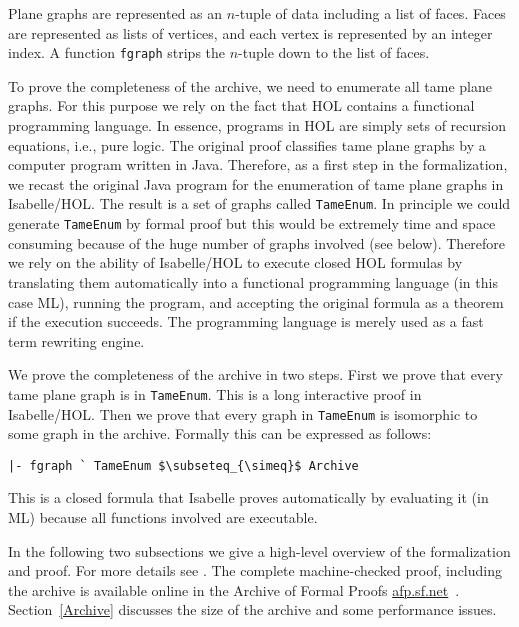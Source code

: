 Plane graphs are represented as an
$n$-tuple of data including a list of faces. Faces are represented
as lists of vertices, and each vertex is represented by an integer index.
A function \verb!fgraph! strips the $n$-tuple down to the list of faces.

To prove the completeness of the archive, we need to enumerate all
tame plane graphs. For this purpose we rely on the fact that HOL
contains a functional programming language. In essence, programs in
HOL are simply sets of recursion equations, i.e., pure logic.  The
original proof classifies tame plane graphs by a computer program
written in Java.  Therefore, as a first step in the formalization, we
recast the original Java program for the enumeration of tame plane graphs in
Isabelle/HOL. The result is a set of graphs called \verb!TameEnum!.  In
principle we could generate \verb!TameEnum! by formal proof but this
would be extremely time and space consuming because of the huge number
of graphs involved (see below). Therefore we rely on the ability of
Isabelle/HOL to execute closed HOL formulas by translating them
automatically into a functional programming language (in this case
ML), running the program, and accepting the original formula as a
theorem if the execution succeeds. The
programming language is merely used as a fast term rewriting engine.

We prove the completeness of the archive in two steps. First
we prove that every tame plane graph is in \verb!TameEnum!.
This is a long interactive proof in Isabelle/HOL.
Then we prove that every graph in \verb!TameEnum! is isomorphic to some
graph in the archive. Formally this can be expressed as follows:

\begin{lstlisting}[keepspaces=true,stringstyle=\tt,basicstyle=\small,%
frame=none,framesep=8pt,mathescape,morekeywords={and,shows},columns=flexible]
|- fgraph ` TameEnum $\subseteq_{\simeq}$ Archive
\end{lstlisting}
This is a closed formula that Isabelle proves automatically by evaluating it
(in ML) because all functions involved are executable.

In the following two subsections we give a high-level overview of the
formalization and proof. For more details see
\cite{NipkowBS-IJCAR06,Nipkow-ITP11}. The complete machine-checked proof,
including the archive is available online in the Archive of Formal Proofs
\url{afp.sf.net}~\cite{BauerN-AFP06}. Section~\ref{Archive} discusses
the size of the archive and some performance issues.

